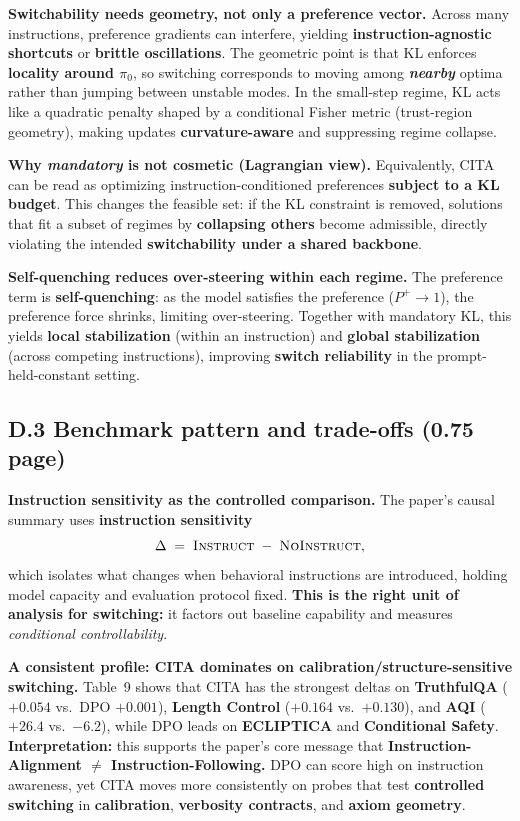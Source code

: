 \noindent\textbf{Switchability needs geometry, not only a preference vector.}
Across many instructions, preference gradients can interfere, yielding \textbf{instruction-agnostic shortcuts} or \textbf{brittle oscillations}. The geometric point is that KL enforces \textbf{locality around $\pi_0$}, so switching corresponds to moving among \textbf{\emph{nearby}} optima rather than jumping between unstable modes. In the small-step regime, KL acts like a quadratic penalty shaped by a conditional Fisher metric (trust-region geometry), making updates \textbf{curvature-aware} and suppressing regime collapse.

\noindent\textbf{Why \emph{mandatory} is not cosmetic (Lagrangian view).}
Equivalently, CITA can be read as optimizing instruction-conditioned preferences \textbf{subject to a KL budget}. This changes the feasible set: if the KL constraint is removed, solutions that fit a subset of regimes by \textbf{collapsing others} become admissible, directly violating the intended \textbf{switchability under a shared backbone}.

\noindent\textbf{Self-quenching reduces over-steering within each regime.}
The preference term is \textbf{self-quenching}: as the model satisfies the preference ($P^+\to 1$), the preference force shrinks, limiting over-steering. Together with mandatory KL, this yields \textbf{local stabilization} (within an instruction) and \textbf{global stabilization} (across competing instructions), improving \textbf{switch reliability} in the prompt-held-constant setting.

\vspace{-0.35em}
\subsection{D.3 Benchmark pattern and trade-offs (0.75 page)}
\vspace{-0.2em}

\noindent\textbf{Instruction sensitivity as the controlled comparison.}
The paper’s causal summary uses \textbf{instruction sensitivity}
\[
\Delta \;=\; \textsc{Instruct} \;-\; \textsc{NoInstruct},
\]
which isolates what changes when behavioral instructions are introduced, holding model capacity and evaluation protocol fixed. \textbf{This is the right unit of analysis for switching:} it factors out baseline capability and measures \emph{conditional controllability}.

\noindent\textbf{A consistent profile: CITA dominates on calibration/structure-sensitive switching.}
Table~9 shows that CITA has the strongest deltas on \textbf{TruthfulQA} ($+0.054$ vs.\ DPO $+0.001$), \textbf{Length Control} ($+0.164$ vs.\ $+0.130$), and \textbf{AQI} ($+26.4$ vs.\ $-6.2$), while DPO leads on \textbf{ECLIPTICA} and \textbf{Conditional Safety}. \textbf{Interpretation:} this supports the paper’s core message that \textbf{Instruction-Alignment $\neq$ Instruction-Following.} DPO can score high on instruction awareness, yet CITA moves more consistently on probes that test \textbf{controlled switching} in \textbf{calibration}, \textbf{verbosity contracts}, and \textbf{axiom geometry}.

